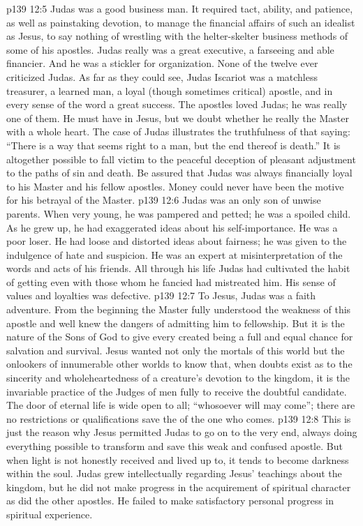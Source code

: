 \vs p139 12:5 \pc Judas was a good business man. It required tact, ability, and patience, as well as painstaking devotion, to manage the financial affairs of such an idealist as Jesus, to say nothing of wrestling with the helter\hyp{}skelter business methods of some of his apostles. Judas really was a great executive, a farseeing and able financier. And he was a stickler for organization. None of the twelve ever criticized Judas. As far as they could see, Judas Iscariot was a matchless treasurer, a learned man, a loyal (though sometimes critical) apostle, and in every sense of the word a great success. The apostles loved Judas; he was really one of them. He must have  in Jesus, but we doubt whether he really  the Master with a whole heart. The case of Judas illustrates the truthfulness of that saying: “There is a way that seems right to a man, but the end thereof is death.” It is altogether possible to fall victim to the peaceful deception of pleasant adjustment to the paths of sin and death. Be assured that Judas was always financially loyal to his Master and his fellow apostles. Money could never have been the motive for his betrayal of the Master.
\vs p139 12:6 Judas was an only son of unwise parents. When very young, he was pampered and petted; he was a spoiled child. As he grew up, he had exaggerated ideas about his self\hyp{}importance. He was a poor loser. He had loose and distorted ideas about fairness; he was given to the indulgence of hate and suspicion. He was an expert at misinterpretation of the words and acts of his friends. All through his life Judas had cultivated the habit of getting even with those whom he fancied had mistreated him. His sense of values and loyalties was defective.
\vs p139 12:7 \pc To Jesus, Judas was a faith adventure. From the beginning the Master fully understood the weakness of this apostle and well knew the dangers of admitting him to fellowship. But it is the nature of the Sons of God to give every created being a full and equal chance for salvation and survival. Jesus wanted not only the mortals of this world but the onlookers of innumerable other worlds to know that, when doubts exist as to the sincerity and wholeheartedness of a creature’s devotion to the kingdom, it is the invariable practice of the Judges of men fully to receive the doubtful candidate. The door of eternal life is wide open to all; “whosoever will may come”; there are no restrictions or qualifications save the  of the one who comes.
\vs p139 12:8 This is just the reason why Jesus permitted Judas to go on to the very end, always doing everything possible to transform and save this weak and confused apostle. But when light is not honestly received and lived up to, it tends to become darkness within the soul. Judas grew intellectually regarding Jesus’ teachings about the kingdom, but he did not make progress in the acquirement of spiritual character as did the other apostles. He failed to make satisfactory personal progress in spiritual experience.
